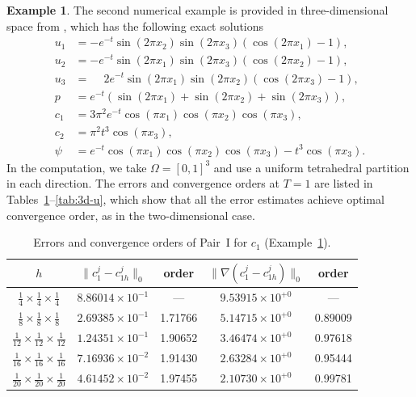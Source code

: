 \documentclass[a4paper,fleqn]{cas-sc}
\numberwithin{equation}{section}
\theoremstyle{definition}
\newtheorem{example}[theorem]{Example}
\begin{document}
\begin{example}
\label{ex:2}
The second numerical example is provided in three-dimensional space from \cite{Gao2017,Li22023},
which has the following exact solutions
\begin{align}
  u_{1} &= -e^{-t}\sin(2\pi x_{2})\sin(2\pi x_{3})\!\left(\cos(2\pi x_{1}) - 1\right),
  \nonumber\\
  u_{2} &= -e^{-t}\sin(2\pi x_{1})\sin(2\pi x_{3})\!\left(\cos(2\pi x_{2}) - 1\right),
  \nonumber\\
  u_{3} &= \phantom{-}2e^{-t}\sin(2\pi x_{1})\sin(2\pi x_{2})\!\left(\cos(2\pi x_{3}) - 1\right),
  \nonumber\\
  p     &= e^{-t}\!\left(\sin(2\pi x_{1}) + \sin(2\pi x_{2}) + \sin(2\pi x_{3})\right),
  \nonumber\\
  c_{1} &= 3\pi^{2}e^{-t}\cos(\pi x_{1})\cos(\pi x_{2})\cos(\pi x_{3}),
  \nonumber\\
  c_{2} &= \pi^{2}t^{3}\cos(\pi x_{3}),
  \nonumber\\
  \psi  &= e^{-t}\cos(\pi x_{1})\cos(\pi x_{2})\cos(\pi x_{3}) - t^{3}\cos(\pi x_{3}).
  \label{eq:6.7}
\end{align}
In the computation, we take $\Omega = [0,1]^{3}$ and use a uniform tetrahedral partition in
each direction. The errors and convergence orders at $T = 1$ are listed in
Tables~\ref{tab:3d-c1}--\ref{tab:3d-u}, which show that all the error estimates achieve
optimal convergence order, as in the two-dimensional case.
\end{example}


\begin{table}[htbp]
\centering
\caption{Errors and convergence orders of Pair~I for $c_{1}$ (Example~\ref{ex:2}).}
\label{tab:3d-c1}
\begin{tabular}{ccccc}
\hline
$h$ &
$\|c_{1}^{j} - c_{1h}^{j}\|_{0}$ & order &
$\|\nabla(c_{1}^{j} - c_{1h}^{j})\|_{0}$ & order \\
\hline
$\tfrac{1}{4}  \times \tfrac{1}{4}  \times \tfrac{1}{4}$  & $8.86014\times10^{-1}$ & ---     & $9.53915\times10^{+0}$ & ---     \\
$\tfrac{1}{8}  \times \tfrac{1}{8}  \times \tfrac{1}{8}$  & $2.69385\times10^{-1}$ & 1.71766 & $5.14715\times10^{+0}$ & 0.89009 \\
$\tfrac{1}{12} \times \tfrac{1}{12} \times \tfrac{1}{12}$ & $1.24351\times10^{-1}$ & 1.90652 & $3.46474\times10^{+0}$ & 0.97618 \\
$\tfrac{1}{16} \times \tfrac{1}{16} \times \tfrac{1}{16}$ & $7.16936\times10^{-2}$ & 1.91430 & $2.63284\times10^{+0}$ & 0.95444 \\
$\tfrac{1}{20} \times \tfrac{1}{20} \times \tfrac{1}{20}$ & $4.61452\times10^{-2}$ & 1.97455 & $2.10730\times10^{+0}$ & 0.99781 \\
\hline
\end{tabular}
\end{table}
\end{document}
